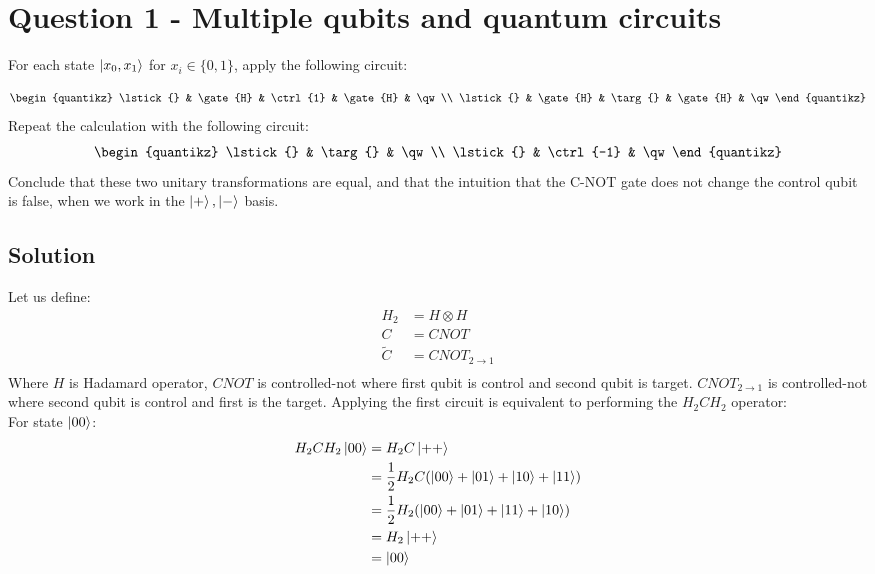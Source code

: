 \section*{Question 1 - Multiple qubits and quantum circuits}

For each state $\ket{x_0,x_1}$ for $x_i\in \{0,1\}$, apply the following circuit:

\[
    \begin{quantikz}
    \lstick{} & \gate{H} & \ctrl{1} & \gate{H} & \qw \\
    \lstick{} & \gate{H} & \targ{}  & \gate{H} & \qw
    \end{quantikz}
\]
Repeat the calculation with the following circuit:
\[
    \begin{quantikz}
        \lstick{} & \targ{} & \qw \\
        \lstick{} & \ctrl{-1} & \qw
    \end{quantikz}
\]
Conclude that these two unitary transformations are equal, and that the intuition that the
C-NOT gate does not change the control qubit is false, when we work in the ${\ket{+}, \ket{-}}$ basis.

\subsection*{Solution}
Let us define:
\begin{align*}
    H_2 &= H \otimes H\\
    C &= CNOT\\
    \tilde{C} &= CNOT_{2\rightarrow 1}\\
\end{align*}
Where $H$ is Hadamard operator, $CNOT$ is controlled-not where first qubit is control and second qubit is target. $CNOT_{2\rightarrow 1}$ is controlled-not where second qubit is control and first is the target.
Applying the first circuit is equivalent to performing the $H_2 C H_2$ operator:\\

For state $\ket{00}$:
\begin{align*}
    H_2 C H_2\ket{00}
    &=H_2 C\ket{++}\\
    &=\frac{1}{2}H_2 C(\ket{00}+\ket{01}+\ket{10}+\ket{11})\\
    &=\frac{1}{2}H_2(\ket{00}+\ket{01}+\ket{11}+\ket{10})\\
    &=H_2\ket{++}\\
    &=\ket{00}
\end{align*}

